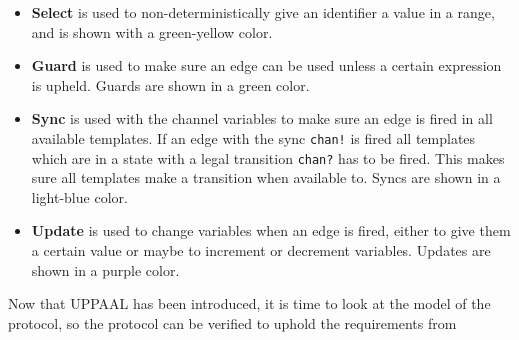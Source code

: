 \begin{itemize}
	\item \textbf{Select} is used to non-deterministically give an identifier a value in a range, and is shown with a green-yellow color.
	\item \textbf{Guard} is used to make sure an edge can be used unless a certain expression is upheld. Guards are shown in a green color.
	\item \textbf{Sync} is used with the channel variables to make sure an edge is fired in all available templates. If an edge with the sync \texttt{chan!} is fired all templates which are in a state with a legal transition \texttt{chan?} has to be fired. This makes sure all templates make a transition when available to. Syncs are shown in a light-blue color.
	\item \textbf{Update} is used to change variables when an edge is fired, either to give them a certain value or maybe to increment or decrement variables. Updates are shown in a purple color.
\end{itemize}

Now that UPPAAL has been introduced, it is time to look at the model of the protocol, so the protocol can be verified to uphold the requirements from 
